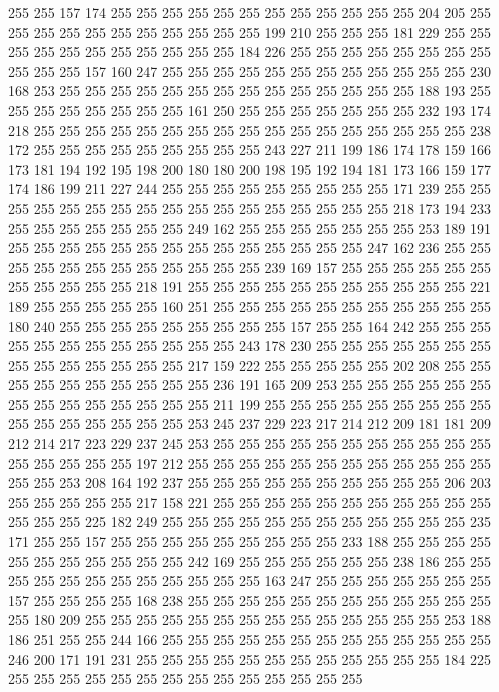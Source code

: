 255 255 157 174 255 255 255 255 255 255 255 255 255 255 255 255 204 205 255 255
255 255 255 255 255 255 255 255 255 199 210 255 255 255 181 229 255 255 255 255
255 255 255 255 255 255 255 184 226 255 255 255 255 255 255 255 255 255 255 255
157 160 247 255 255 255 255 255 255 255 255 255 255 255 255 230 168 253 255 255
255 255 255 255 255 255 255 255 255 255 255 255 188 193 255 255 255 255 255 255
255 255 161 250 255 255 255 255 255 255 255 232 193 174 218 255 255 255 255 255
255 255 255 255 255 255 255 255 255 255 255 255 238 172 255 255 255 255 255 255
255 255 255 243 227 211 199 186 174 178 159 166 173 181 194 192 195 198 200 180
180 200 198 195 192 194 181 173 166 159 177 174 186 199 211 227 244 255 255 255
255 255 255 255 255 255 171 239 255 255 255 255 255 255 255 255 255 255 255 255
255 255 255 255 255 218 173 194 233 255 255 255 255 255 255 255 249 162 255 255
255 255 255 255 255 253 189 191 255 255 255 255 255 255 255 255 255 255 255 255
255 255 247 162 236 255 255 255 255 255 255 255 255 255 255 255 255 239 169 157
255 255 255 255 255 255 255 255 255 255 255 218 191 255 255 255 255 255 255 255
255 255 255 255 221 189 255 255 255 255 255 160 251 255 255 255 255 255 255 255
255 255 255 255 180 240 255 255 255 255 255 255 255 255 255 157 255 255 164 242
255 255 255 255 255 255 255 255 255 255 255 255 243 178 230 255 255 255 255 255
255 255 255 255 255 255 255 255 255 217 159 222 255 255 255 255 255 202 208 255
255 255 255 255 255 255 255 255 255 236 191 165 209 253 255 255 255 255 255 255
255 255 255 255 255 255 255 255 211 199 255 255 255 255 255 255 255 255 255 255
255 255 255 255 255 255 253 245 237 229 223 217 214 212 209 181 181 209 212 214
217 223 229 237 245 253 255 255 255 255 255 255 255 255 255 255 255 255 255 255
255 255 197 212 255 255 255 255 255 255 255 255 255 255 255 255 255 255 253 208
164 192 237 255 255 255 255 255 255 255 255 255 255 206 203 255 255 255 255 255
217 158 221 255 255 255 255 255 255 255 255 255 255 255 255 255 255 225 182 249
255 255 255 255 255 255 255 255 255 255 255 255 235 171 255 255 157 255 255 255
255 255 255 255 255 255 233 188 255 255 255 255 255 255 255 255 255 255 255 242
169 255 255 255 255 255 255 238 186 255 255 255 255 255 255 255 255 255 255 255
255 163 247 255 255 255 255 255 255 255 157 255 255 255 255 168 238 255 255 255
255 255 255 255 255 255 255 255 255 255 180 209 255 255 255 255 255 255 255 255
255 255 255 255 255 255 253 188 186 251 255 255 244 166 255 255 255 255 255 255
255 255 255 255 255 255 255 246 200 171 191 231 255 255 255 255 255 255 255 255
255 255 255 255 184 225 255 255 255 255 255 255 255 255 255 255 255 255 255 255
